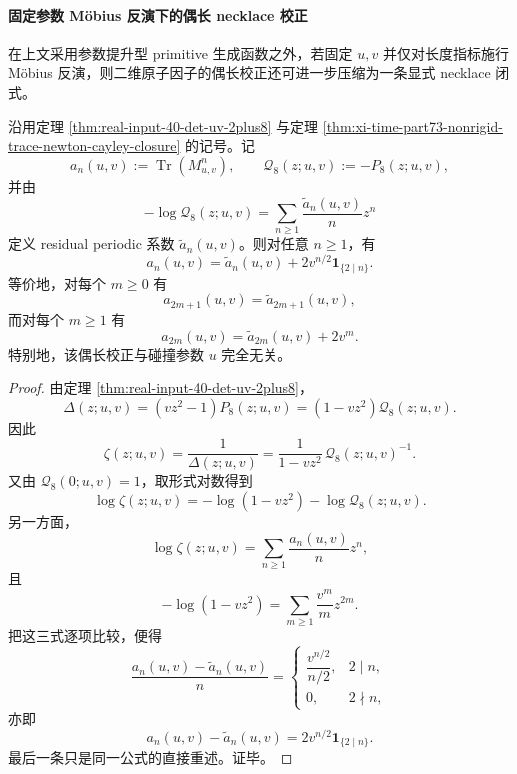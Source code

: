 \paragraph{固定参数 Möbius 反演下的偶长 necklace 校正}
在上文采用参数提升型 primitive 生成函数之外，若固定 \(u,v\) 并仅对长度指标施行 Möbius 反演，则二维原子因子的偶长校正还可进一步压缩为一条显式 necklace 闭式。

\begin{theorem}\label{thm:xi-time-part73c-periodic-evenlength-atomic-correction}
沿用定理 \ref{thm:real-input-40-det-uv-2plus8} 与定理 \ref{thm:xi-time-part73-nonrigid-trace-newton-cayley-closure} 的记号。记
\[
a_n(u,v):=\operatorname{Tr}(M_{u,v}^n),
\qquad
\mathcal Q_8(z;u,v):=-P_8(z;u,v),
\]
并由
\[
-\log \mathcal Q_8(z;u,v)=\sum_{n\ge 1}\frac{\widetilde a_n(u,v)}{n}z^n
\]
定义 residual periodic 系数 \(\widetilde a_n(u,v)\)。则对任意 \(n\ge 1\)，有
\[
a_n(u,v)=\widetilde a_n(u,v)+2v^{n/2}\mathbf 1_{\{2\mid n\}}.
\]
等价地，对每个 \(m\ge 0\) 有
\[
a_{2m+1}(u,v)=\widetilde a_{2m+1}(u,v),
\]
而对每个 \(m\ge 1\) 有
\[
a_{2m}(u,v)=\widetilde a_{2m}(u,v)+2v^m.
\]
特别地，该偶长校正与碰撞参数 \(u\) 完全无关。
\end{theorem}
\begin{proof}
由定理 \ref{thm:real-input-40-det-uv-2plus8}，
\[
\Delta(z;u,v)=(vz^2-1)P_8(z;u,v)=(1-vz^2)\mathcal Q_8(z;u,v).
\]
因此
\[
\zeta(z;u,v)=\frac{1}{\Delta(z;u,v)}
=
\frac{1}{1-vz^2}\,\mathcal Q_8(z;u,v)^{-1}.
\]
又由 \(\mathcal Q_8(0;u,v)=1\)，取形式对数得到
\[
\log\zeta(z;u,v)
=
-\log(1-vz^2)-\log \mathcal Q_8(z;u,v).
\]
另一方面，
\[
\log\zeta(z;u,v)=\sum_{n\ge 1}\frac{a_n(u,v)}{n}z^n,
\]
且
\[
-\log(1-vz^2)=\sum_{m\ge 1}\frac{v^m}{m}z^{2m}.
\]
把这三式逐项比较，便得
\[
\frac{a_n(u,v)-\widetilde a_n(u,v)}{n}
=
\begin{cases}
\dfrac{v^{n/2}}{n/2},& 2\mid n,\\[6pt]
0,& 2\nmid n,
\end{cases}
\]
亦即
\[
a_n(u,v)-\widetilde a_n(u,v)=2v^{n/2}\mathbf 1_{\{2\mid n\}}.
\]
最后一条只是同一公式的直接重述。证毕。
\end{proof}

